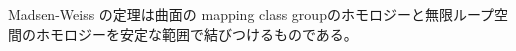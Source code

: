 \documentclass[dvipdfmx]{jsarticle}
\begin{document}
Madsen-Weiss の定理は曲面の mapping class groupのホモロジーと無限ループ空間のホモロジーを安定な範囲で結びつけるものである。
\end{document}
